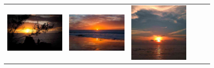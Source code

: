 \begin{figure}
\begin{tabular}{m{.01\linewidth} m{.16\linewidth} m{.16\linewidth} m{.16\linewidth} m{.16\linewidth} m{.16\linewidth}}
    \includegraphics[width=\linewidth]{../style/figures/flickr_on_flickr/pred_style_Sunny/2.jpg} &
    \includegraphics[width=\linewidth]{../style/figures/flickr_on_flickr/pred_style_Sunny/3.jpg} &
    \includegraphics[width=\linewidth]{../style/figures/flickr_on_flickr/pred_style_Sunny/4.jpg} \\

\end{tabular}
\end{figure}
